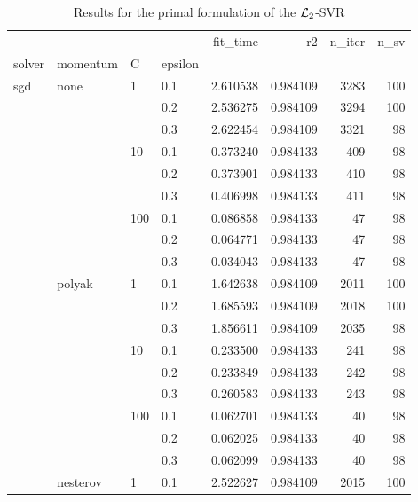 \begin{table}[H]
\centering
\caption{Results for the primal formulation of the $\protect \mathcal{L}_2$-SVR}
\label{primal_l2_svr_cv_results}
\begin{tabular}{llllrrrr}
\toprule
          &   &     &     &  fit\_time &        r2 &  n\_iter &  n\_sv \\
solver & momentum & C & epsilon &           &           &         &       \\
\midrule
sgd & none & 1   & 0.1 &  2.610538 &  0.984109 &    3283 &   100 \\
          &   &     & 0.2 &  2.536275 &  0.984109 &    3294 &   100 \\
          &   &     & 0.3 &  2.622454 &  0.984109 &    3321 &    98 \\
          &   & 10  & 0.1 &  0.373240 &  0.984133 &     409 &    98 \\
          &   &     & 0.2 &  0.373901 &  0.984133 &     410 &    98 \\
          &   &     & 0.3 &  0.406998 &  0.984133 &     411 &    98 \\
          &   & 100 & 0.1 &  0.086858 &  0.984133 &      47 &    98 \\
          &   &     & 0.2 &  0.064771 &  0.984133 &      47 &    98 \\
          &   &     & 0.3 &  0.034043 &  0.984133 &      47 &    98 \\
          & polyak & 1   & 0.1 &  1.642638 &  0.984109 &    2011 &   100 \\
          &   &     & 0.2 &  1.685593 &  0.984109 &    2018 &   100 \\
          &   &     & 0.3 &  1.856611 &  0.984109 &    2035 &    98 \\
          &   & 10  & 0.1 &  0.233500 &  0.984133 &     241 &    98 \\
          &   &     & 0.2 &  0.233849 &  0.984133 &     242 &    98 \\
          &   &     & 0.3 &  0.260583 &  0.984133 &     243 &    98 \\
          &   & 100 & 0.1 &  0.062701 &  0.984133 &      40 &    98 \\
          &   &     & 0.2 &  0.062025 &  0.984133 &      40 &    98 \\
          &   &     & 0.3 &  0.062099 &  0.984133 &      40 &    98 \\
          & nesterov & 1   & 0.1 &  2.522627 &  0.984109 &    2015 &   100 \\

\end{tabular}
\end{table}
